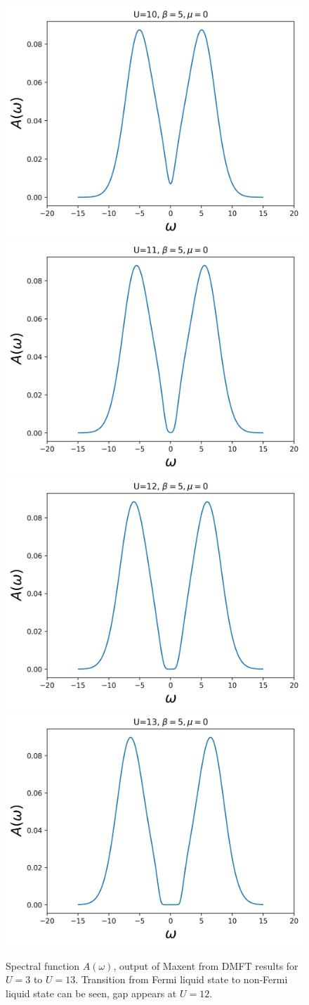 \begin{figure}[ht]
        \includegraphics[width=0.45\linewidth]{fig2/spectral10.png}
         \includegraphics[width=0.45\linewidth]{fig2/spectral11.png}
          \includegraphics[width=0.45\linewidth]{fig2/spectral12.png}
           \includegraphics[width=0.45\linewidth]{fig2/spectral13.png}
\caption{ Spectral function $A(\omega)$, output of Maxent from DMFT results for $U=3$ to $U=13$. Transition from Fermi liquid state to non-Fermi liquid state can be seen, gap appears at $U=12$. \label{fig:DMFT_spectral}}
\vspace{-20pt}
\end{figure} 


